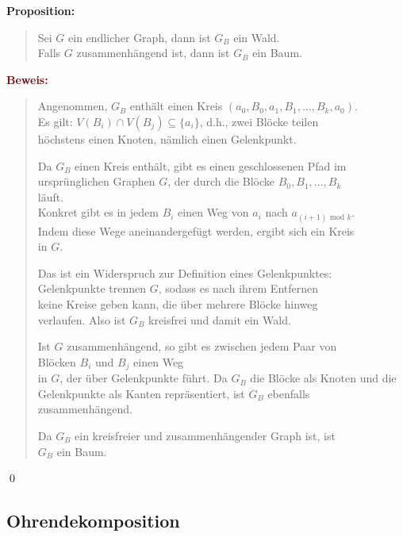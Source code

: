 \documentclass{article}
\newcommand{\dgr}[1]{\textcolor{dgr}{#1}}
\newcommand{\maroon}[1]{\textcolor{maroon}{#1}}
\newcommand{\prop}[1]{\dgr{\textbf{Proposition: }}\begin{quote}#1\end{quote}}
\newcommand{\pr}[1]{\maroon{\textbf{Beweis: }}\begin{quote}#1\end{quote}\qed}
\renewcommand{\mod}{\text{ mod }}
\begin{document}
\newpage
\prop{
    Sei $G$ ein endlicher Graph, dann ist $G_B$ ein Wald.\\
    Falls $G$ zusammenhängend ist, dann ist $G_B$ ein Baum.
}
\pr{
    Angenommen, \(G_B\) enthält einen Kreis \((a_0, B_0, a_1, B_1, \dots, B_k, a_0)\).  \\
    Es gilt: \(V(B_i) \cap V(B_j) \subseteq \{a_i\}\), d.h., zwei Blöcke teilen\\
    höchstens einen Knoten, nämlich einen Gelenkpunkt.

    Da \(G_B\) einen Kreis enthält, gibt es einen geschlossenen Pfad im\\
    ursprünglichen Graphen \(G\), der durch die Blöcke \(B_0, B_1, \dots, B_k\) \\läuft.\\
    Konkret gibt es in jedem \(B_i\) einen Weg von \(a_i\) nach \(a_{(i+1) \mod k}\).\\
    Indem diese Wege aneinandergefügt werden, ergibt sich ein Kreis \\
    in \(G\).

    Das ist ein Widerspruch zur Definition eines Gelenkpunktes:\\
    Gelenkpunkte trennen \(G\), sodass es nach ihrem Entfernen\\
    keine Kreise geben kann, die über mehrere Blöcke hinweg\\
    verlaufen. Also ist \(G_B\) kreisfrei und damit ein Wald.

    Ist \(G\) zusammenhängend, so gibt es zwischen jedem Paar von\\
    Blöcken \(B_i\) und \(B_j\) einen Weg\\
    in \(G\), der über Gelenkpunkte führt. Da \(G_B\) die Blöcke als Knoten und die Gelenkpunkte als Kanten repräsentiert, ist \(G_B\) ebenfalls zusammenhängend.

    Da \(G_B\) ein kreisfreier und zusammenhängender Graph ist, ist \\
    \(G_B\) ein Baum.
}

\subsection{Ohrendekomposition}
\end{document}
